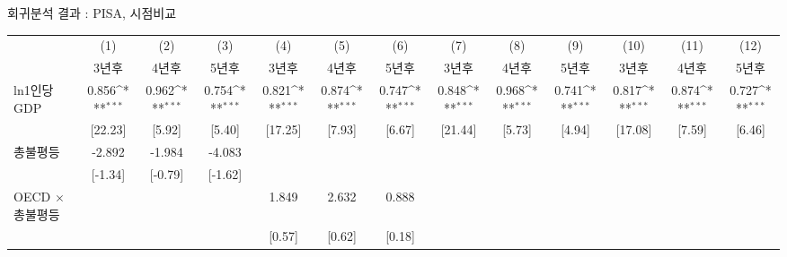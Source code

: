 \centering
\def\sym#1{\ifmmode^{#1}\else\(^{#1}\)\fi}
\caption{회귀분석 결과 : PISA, 시점비교 \label{tab:pisa_rob2}}
\begin{tabular}{l*{12}{c}}
\toprule
                    &\multicolumn{1}{c}{(1)}&\multicolumn{1}{c}{(2)}&\multicolumn{1}{c}{(3)}&\multicolumn{1}{c}{(4)}&\multicolumn{1}{c}{(5)}&\multicolumn{1}{c}{(6)}&\multicolumn{1}{c}{(7)}&\multicolumn{1}{c}{(8)}&\multicolumn{1}{c}{(9)}&\multicolumn{1}{c}{(10)}&\multicolumn{1}{c}{(11)}&\multicolumn{1}{c}{(12)}\\
                    &\multicolumn{1}{c}{3년후}&\multicolumn{1}{c}{4년후}&\multicolumn{1}{c}{5년후}&\multicolumn{1}{c}{3년후}&\multicolumn{1}{c}{4년후}&\multicolumn{1}{c}{5년후}&\multicolumn{1}{c}{3년후}&\multicolumn{1}{c}{4년후}&\multicolumn{1}{c}{5년후}&\multicolumn{1}{c}{3년후}&\multicolumn{1}{c}{4년후}&\multicolumn{1}{c}{5년후}\\
\midrule
ln1인당GDP        &       0.856\sym{***}&       0.962\sym{***}&       0.754\sym{***}&       0.821\sym{***}&       0.874\sym{***}&       0.747\sym{***}&       0.848\sym{***}&       0.968\sym{***}&       0.741\sym{***}&       0.817\sym{***}&       0.874\sym{***}&       0.727\sym{***}\\
                    &     [22.23]         &      [5.92]         &      [5.40]         &     [17.25]         &      [7.93]         &      [6.67]         &     [21.44]         &      [5.73]         &      [4.94]         &     [17.08]         &      [7.59]         &      [6.46]         \\
\addlinespace
총불평등          &      -2.892         &      -1.984         &      -4.083         &                     &                     &                     &                     &                     &                     &                     &                     &                     \\
                    &     [-1.34]         &     [-0.79]         &     [-1.62]         &                     &                     &                     &                     &                     &                     &                     &                     &                     \\
\addlinespace
OECD $\times$ 총불평등&                     &                     &                     &       1.849         &       2.632         &       0.888         &                     &                     &                     &                     &                     &                     \\
                    &                     &                     &                     &      [0.57]         &      [0.62]         &      [0.18]         &                     &                     &                     &                     &                     &                     \\

\end{tabular}
